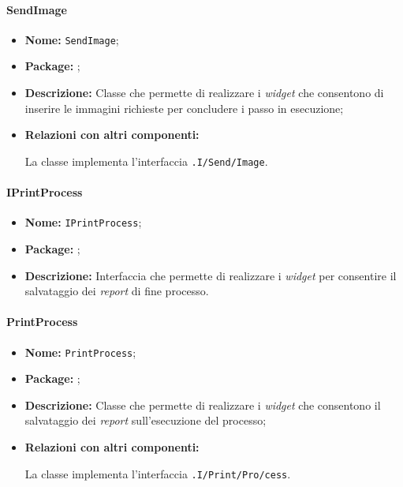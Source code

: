 \paragraph{SendImage}
\begin{flushleft}
\begin{itemize}
\item \textbf{Nome:} \texttt{SendImage};
\item \textbf{Package:} \texttt{\viewUser{}};
\item \textbf{Descrizione:} Classe che permette di realizzare i \textit{widget} che consentono di inserire le immagini richieste per concludere i passo in esecuzione;
\item \textbf{Relazioni con altri componenti:}
\begin{sloppypar}
La classe implementa l'interfaccia \texttt{\viewUser{}.I\fshyp{}Send\fshyp{}Image}.
\end{sloppypar}
\end{itemize}
\end{flushleft}

\paragraph{IPrintProcess}
\begin{itemize}
\item \textbf{Nome:} \texttt{IPrintProcess};
\item \textbf{Package:} \texttt{\viewUser{}};
\item \textbf{Descrizione:} Interfaccia che permette di realizzare i \textit{widget} per consentire il salvataggio dei \textit{report} di fine processo.
\end{itemize}

\paragraph{PrintProcess}
\begin{flushleft}
\begin{itemize}
\item \textbf{Nome:} \texttt{PrintProcess};
\item \textbf{Package:} \texttt{\viewUser{}};
\item \textbf{Descrizione:} Classe che permette di realizzare i \textit{widget} che consentono il salvataggio dei \textit{report} sull'esecuzione del processo;
\item \textbf{Relazioni con altri componenti:}
\begin{sloppypar}
La classe implementa l'interfaccia \texttt{\viewUser{}.I\fshyp{}Print\fshyp{}Pro\fshyp{}cess}.
\end{sloppypar}
\end{itemize}
\end{flushleft}
